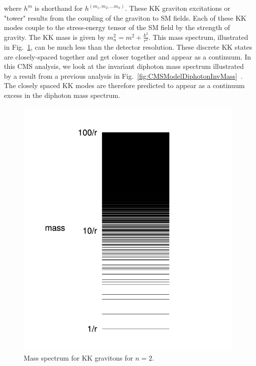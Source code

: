 where $h^{m}$ is shorthand for $h^{(m_1,m_2,...m_n)}$. 
These KK graviton excitations or "tower" results from the coupling of the graviton to SM fields. Each of these KK modes couple to the stress-energy tensor of the SM field by the strength of gravity. The KK mass is given by $m^2_n = m^2 + \frac{k^2}{r^2}$. This mass spectrum, illustrated in Fig.~\ref{fig:KKmassSpectrum}, can be much less than the detector resolution. These discrete KK states are closely-spaced together and get closer together and appear as a continuum. In this CMS analysis, we look at the invariant diphoton mass spectrum illustrated by a result from a previous analysis in Fig.~\ref{fig:CMSModelDiphotonInvMass}~\cite{CMS:2011uvc}. The closely spaced KK modes are therefore predicted to appear as a continuum excess in the diphoton mass spectrum. 

\begin{figure}
    \centering
    \includegraphics[scale=0.4]{fig/KKMassSpectrum.png}
    \caption{Mass spectrum for KK gravitons for $n=2$.}
    \label{fig:KKmassSpectrum}
\end{figure}


